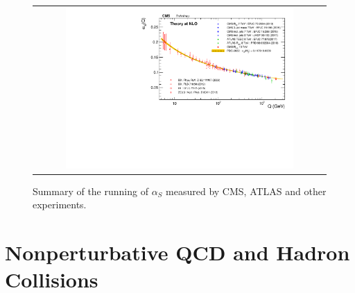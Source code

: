 \begin{figure}[tbh!]
 \begin{center}
 \begin{tabular}{c}
 \includegraphics[width=0.8\textwidth]{figures/Part1/QCD/alphaS}
 \end{tabular}
 \caption{Summary of the running of $\alpha_{S}$ measured by \ac{CMS}, \ac{ATLAS} and other experiments. \cite{cms:twiki}}
 \label{fig:alphaS}
 \end{center}
\end{figure}

\section{Nonperturbative QCD and Hadron Collisions}
\label{sec:Collision}